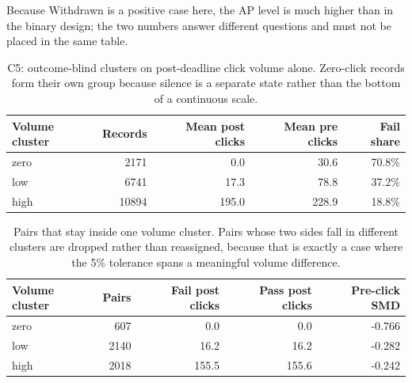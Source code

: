 \documentclass[11pt]{article}
\begin{document}
Because Withdrawn is a positive case here, the AP level is much higher than in the binary design; the two numbers answer different questions and must not be placed in the same table.
\begin{table}[t]
\centering
\footnotesize
\begin{tabular}{lrrrr}
\toprule
Volume cluster & Records & Mean post clicks & Mean pre clicks & Fail share \\
\midrule
zero & 2171 & 0.0 & 30.6 & 70.8\% \\
low & 6741 & 17.3 & 78.8 & 37.2\% \\
high & 10894 & 195.0 & 228.9 & 18.8\% \\
\bottomrule
\end{tabular}
\caption{C5: outcome-blind clusters on post-deadline click volume alone. Zero-click records form their own group because silence is a separate state rather than the bottom of a continuous scale.}
\label{tab:c5pop}
\end{table}
\begin{table}[t]
\centering
\footnotesize
\begin{tabular}{lrrrr}
\toprule
Volume cluster & Pairs & Fail post clicks & Pass post clicks & Pre-click SMD \\
\midrule
zero & 607 & 0.0 & 0.0 & -0.766 \\
low & 2140 & 16.2 & 16.2 & -0.282 \\
high & 2018 & 155.5 & 155.6 & -0.242 \\
\bottomrule
\end{tabular}
\caption{Pairs that stay inside one volume cluster. Pairs whose two sides fall in different clusters are dropped rather than reassigned, because that is exactly a case where the 5\% tolerance spans a meaningful volume difference.}
\label{tab:c5bal}
\end{table}
\end{document}
